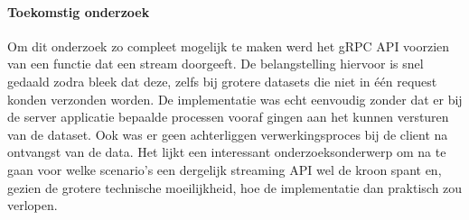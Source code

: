 \paragraph{Toekomstig onderzoek}
Om dit onderzoek zo compleet mogelijk te maken werd het gRPC API voorzien van een functie dat een stream doorgeeft.
De belangstelling hiervoor is snel gedaald zodra bleek dat deze, zelfs bij grotere datasets die niet in één request konden verzonden worden.
De implementatie was echt eenvoudig zonder dat er bij de server applicatie bepaalde processen vooraf gingen aan het kunnen versturen van de dataset.
Ook was er geen achterliggen verwerkingsproces bij de client na ontvangst van de data.
Het lijkt een interessant onderzoeksonderwerp om na te gaan voor welke scenario's een dergelijk streaming API wel de kroon spant en,
gezien de grotere technische moeilijkheid, hoe de implementatie dan praktisch zou verlopen.
